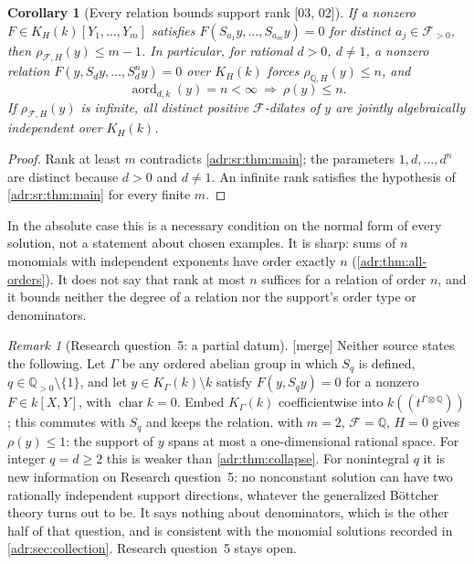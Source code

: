 \documentclass[11pt,letterpaper]{article}
\numberwithin{equation}{section}
\newtheorem{corollary}[corollary]{Corollary}
\theoremstyle{definition}
\theoremstyle{remark}
\newtheorem{remark}[remark]{Remark}
\newcommand{\Q}{\mathbb Q}
\newcommand{\K}{K_\Gamma(k)}
\newcommand{\mtag}{\textup{[merge]}}%
\newcommand{\src}[1]{\textup{[#1]}}%
\begin{document}
\begin{corollary}[Every relation bounds support rank \src{03, 02}]
\label{adr:sr:cor:relation}
If a nonzero $F\in K_H(k)[Y_1,\ldots,Y_m]$ satisfies
$F(S_{a_1}y,\ldots,S_{a_m}y)=0$ for distinct $a_j\in\mathcal F_{>0}$, then
$\rho_{\mathcal F,H}(y)\le m-1$. In particular, for rational $d>0$, $d\ne1$,
a nonzero relation $F(y,S_dy,\ldots,S_d^ny)=0$ over $K_H(k)$ forces
$\rho_{\Q,H}(y)\le n$, and
\[
 \operatorname{aord}_{d,k}(y)=n<\infty\ \Longrightarrow\ \rho(y)\le n.
\]
If $\rho_{\mathcal F,H}(y)$ is infinite, all distinct positive
$\mathcal F$-dilates of $y$ are jointly algebraically independent over
$K_H(k)$.
\end{corollary}
\begin{proof}
Rank at least $m$ contradicts \cref{adr:sr:thm:main}; the parameters
$1,d,\ldots,d^n$ are distinct because $d>0$ and $d\ne1$. An infinite rank
satisfies the hypothesis of \cref{adr:sr:thm:main} for every finite $m$.
\end{proof}

In the absolute case this is a necessary condition on the normal form of
every solution, not a statement about chosen examples. It is sharp: sums of
$n$ monomials with independent exponents have order exactly $n$
(\cref{adr:thm:all-orders}). It does not say that rank at most $n$ suffices
for a relation of order $n$, and it bounds neither the degree of a relation
nor the support's order type or denominators.

\begin{remark}[Research question~5: a partial datum]
\label{adr:sr:rem:question-five}
\mtag{} Neither source states the following. Let $\Gamma$ be any ordered
abelian group in which $S_q$ is defined, $q\in\Q_{>0}\setminus\{1\}$, and let
$y\in\K\setminus k$ satisfy $F(y,S_qy)=0$ for a nonzero $F\in k[X,Y]$, with
$\operatorname{char}k=0$. Embed $\K$ coefficientwise into
$k((t^{\Gamma\otimes\Q}))$; this commutes with $S_q$ and keeps the relation.
 with $m=2$, $\mathcal F=\Q$, $H=0$ gives
$\rho(y)\le1$: the support of $y$ spans at most a one-dimensional rational
space. For integer $q=d\ge2$ this is weaker than \cref{adr:thm:collapse}. For
nonintegral $q$ it is new information on Research question~5: no nonconstant
solution can have two rationally independent support directions, whatever the
generalized B\"ottcher theory turns out to be. It says nothing about
denominators, which is the other half of that question, and is consistent with
the monomial solutions recorded in \cref{adr:sec:collection}. Research
question~5 stays open.
\end{remark}
\end{document}
